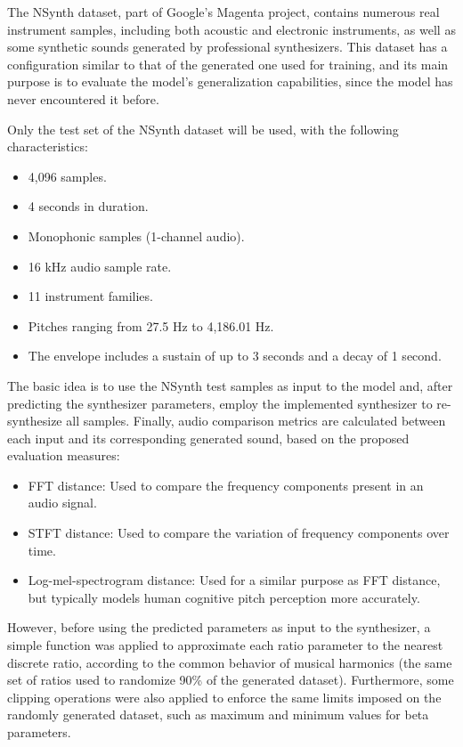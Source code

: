 \documentclass[sigconf,natbib=false]{acmart}
\begin{document}
The NSynth dataset, part of Google’s Magenta project, contains numerous real instrument samples, including both acoustic and electronic instruments, as well as some synthetic sounds generated by professional synthesizers. This dataset has a configuration similar to that of the generated one used for training, and its main purpose is to evaluate the model’s generalization capabilities, since the model has never encountered it before.

Only the test set of the NSynth dataset will be used, with the following characteristics:

\begin{itemize}
    \item 4,096 samples.
    \item 4 seconds in duration.
    \item Monophonic samples (1-channel audio).
    \item 16 kHz audio sample rate.
    \item 11 instrument families.
    \item Pitches ranging from 27.5 Hz to 4,186.01 Hz.
    \item The envelope includes a sustain of up to 3 seconds and a decay of 1 second.
\end{itemize}

The basic idea is to use the NSynth test samples as input to the model and, after predicting the synthesizer parameters, employ the implemented synthesizer to re-synthesize all samples. Finally, audio comparison metrics are calculated between each input and its corresponding generated sound, based on the proposed evaluation measures:

\begin{itemize}
    \item FFT distance: Used to compare the frequency components present in an audio signal.
    \item STFT distance: Used to compare the variation of frequency components over time.
    \item Log-mel-spectrogram distance: Used for a similar purpose as FFT distance, but typically models human cognitive pitch perception more accurately.
\end{itemize}

However, before using the predicted parameters as input to the synthesizer, a simple function was applied to approximate each ratio parameter to the nearest discrete ratio, according to the common behavior of musical harmonics (the same set of ratios used to randomize 90\% of the generated dataset). Furthermore, some clipping operations were also applied to enforce the same limits imposed on the randomly generated dataset, such as maximum and minimum values for beta parameters.
\end{document}
